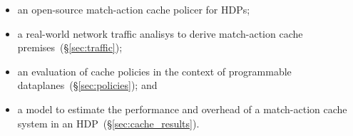\begin{itemize}[noitemsep,topsep=0pt]
	\item an open-source match-action cache policer for HDPs;
	\item a real-world network traffic analisys to derive match-action cache premises~(\S\ref{sec:traffic});
	\item an evaluation of cache policies in the context of programmable dataplanes~(\S\ref{sec:policies}); and
	\item a model to estimate the performance and overhead of a match-action cache system in an HDP~(\S\ref{sec:cache_results}).
\end{itemize}

